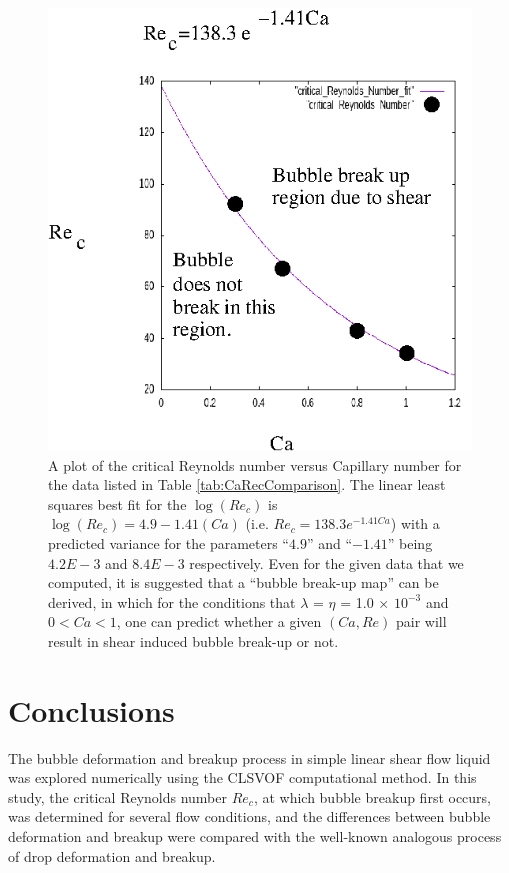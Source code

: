\documentclass[%
 reprint,
 showkeys,
 amsmath,amssymb,
 aps,
 prfluids,
 onecolumn
]{revtex4-2}
\begin{document}
\begin{figure}%
  \centering
  \includegraphics[width=\textwidth]{critical_Reynolds_Number_label}
  \caption{A plot of the critical Reynolds number versus Capillary number
	for the data listed in Table \ref{tab:CaRecComparison}.  The
	linear least squares best fit for the $\log(Re_{c})$ is
	$\log(Re_{c})=4.9-1.41(Ca)$ (i.e. $Re_{c}=138.3 e^{-1.41 Ca}$)
	with a predicted variance
	for the parameters ``$4.9$'' and ``$-1.41$'' being
	$4.2E-3$ and $8.4E-3$ respectively.  Even for the
	given data that we computed, it is suggested that 
	a ``bubble break-up map''
	can be derived, in which for the conditions that
	$\lambda$ = $\eta$ = 1.0 $\times$ $10^{-3}$ and $0<Ca<1$, one
	can predict whether a given $(Ca,Re)$ pair will result in shear
	induced bubble break-up or not.  
	   }
  \label{fig:CaRecFit}
\end{figure}
%

\section{Conclusions}
The bubble deformation and breakup process in simple linear shear flow liquid
was explored numerically using the CLSVOF computational method.  In this study,
the critical Reynolds number $Re_{c}$, at which bubble breakup first occurs,
was determined for several flow conditions, and the differences between bubble
deformation and breakup were compared with the well-known analogous process of
drop deformation and breakup.
\end{document}
